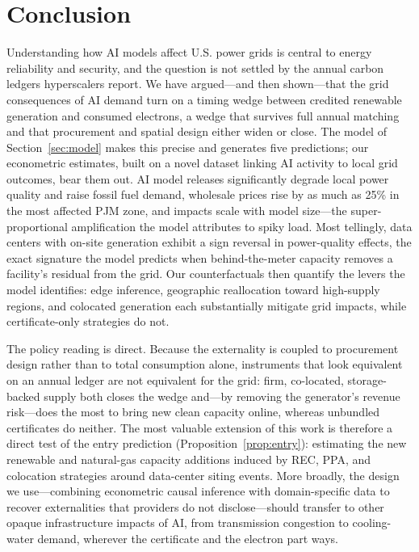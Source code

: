 \documentclass[a4paper,fleqn,longmktitle]{cas-sc}
\theoremstyle{plain}
\theoremstyle{definition}
\begin{document}
\section{Conclusion}
Understanding how AI models affect U.S. power grids is central to energy reliability and security, and the question is not settled by the annual carbon ledgers hyperscalers report. We have argued---and then shown---that the grid consequences of AI demand turn on a timing wedge between credited renewable generation and consumed electrons, a wedge that survives full annual matching and that procurement and spatial design either widen or close. The model of Section~\ref{sec:model} makes this precise and generates five predictions; our econometric estimates, built on a novel dataset linking AI activity to local grid outcomes, bear them out. AI model releases significantly degrade local power quality and raise fossil fuel demand, wholesale prices rise by as much as 25\% in the most affected PJM zone, and impacts scale with model size---the super-proportional amplification the model attributes to spiky load. Most tellingly, data centers with on-site generation exhibit a sign reversal in power-quality effects, the exact signature the model predicts when behind-the-meter capacity removes a facility's residual from the grid. Our counterfactuals then quantify the levers the model identifies: edge inference, geographic reallocation toward high-supply regions, and colocated generation each substantially mitigate grid impacts, while certificate-only strategies do not.

The policy reading is direct. Because the externality is coupled to procurement design rather than to total consumption alone, instruments that look equivalent on an annual ledger are not equivalent for the grid: firm, co-located, storage-backed supply both closes the wedge and---by removing the generator's revenue risk---does the most to bring new clean capacity online, whereas unbundled certificates do neither. The most valuable extension of this work is therefore a direct test of the entry prediction (Proposition~\ref{prop:entry}): estimating the new renewable and natural-gas capacity additions induced by REC, PPA, and colocation strategies around data-center siting events. More broadly, the design we use---combining econometric causal inference with domain-specific data to recover externalities that providers do not disclose---should transfer to other opaque infrastructure impacts of AI, from transmission congestion to cooling-water demand, wherever the certificate and the electron part ways.
\end{document}
